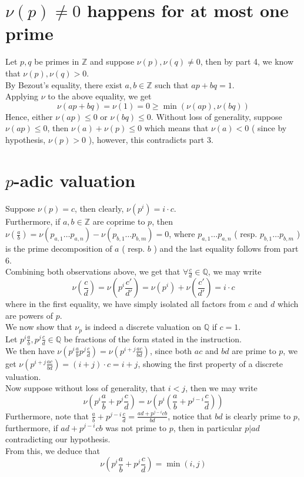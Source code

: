 \documentclass[11pt, a4paper]{article}
\begin{document}
\section*{$\nu( p) \neq 0$ happens for at most one prime}
Let $p,q$ be primes in $\mathbb{Z}$ and suppose $\nu( p) ,\nu( q) \neq 0$, then by part 4, we know that $\nu( p),\nu( q) >0 $.\\
By Bezout's equality, there exist $a,b \in \mathbb{Z}$ such that $ a p + bq =1$.\\
Applying $\nu$ to the above equality, we get
\[ 
\nu( ap + bq)  = \nu( 1) = 0 \geq \min ( \nu( ap) , \nu( bq) ) 
\]
Hence, either $ \nu( ap) \leq 0$ or $\nu( bq) \leq 0$. Without loss of generality, suppose $ \nu( ap) \leq 0$, then $\nu( a) +\nu( p) \leq 0$ which means that $\nu( a) <0$ ( since by hypothesis, $\nu( p) >0$ ), however, this contradicts part 3.
\section*{$p$-adic valuation}
Suppose $\nu( p) = c$, then clearly, $\nu( p^{i}) = i\cdot c$.\\
Furthermore, if $a,b\in \mathbb{Z}$ are coprime to $p$, then $ \nu( \frac{a}{b}) = \nu( p_{a,1} \ldots p_{a,n} 	) - \nu( p_{b,1} \ldots p_{b,m} )=0 $, where $p_{a,1}\ldots p_{a,n}  $ ( resp. $ p_{b,1} \ldots p_{b,m} $  ) is the prime decomposition of $a$ ( resp. $b$ ) and the last equality follows from part 6.\\
Combining both observations above, we get that $ \forall \frac{c}{d}\in \mathbb{Q}$, we may write
\[ 
\nu( \frac{c}{d}) = \nu( p^{i} \frac{c'}{d'}) =\nu(p^{i}) + \nu( \frac{c'}{d'}) = i\cdot c
\]
where in the first equality, we have simply isolated all factors from $c$ and $d$ which are powers of $p$.\\
We now show that $\nu_p$ is indeed a discrete valuation on $ \mathbb{Q}$ if $c=1$.\\
Let $ p^{i} \frac{a}{b}, p^{j} \frac{c}{d}\in \mathbb{Q}$ be fractions of the form stated in the instruction.\\
We then have $\nu\left( p^{i} \frac{a}{b} p^{j} \frac{c}{d}	\right) = \nu( p^{i+j} \frac{ac}{bd})  $, since both $ac$ and $bd$ are prime to $p$, we get $\nu\left( p^{i+j} \frac{ac}{bd}\right) = ( i+j )\cdot c = i+j$, showing the first property of a discrete valuation.\\
Now suppose without loss of generality, that $ i<j$, then we may write 
\[ 
\nu( p^{i}\frac{a}{b}+ p^{j}\frac{c}{d}) = \nu\left( p^{i}\left( \frac{a}{b}+ p^{j-i} \frac{c}{d}\right) \right) 
\]
Furthermore, note that $ \frac{a}{b}+ p^{j-i}\frac{c}{d}= \frac{ad+ p^{j-i}cb}{bd}$, notice that $bd$ is clearly prime to $p$, furthermore, if $ad + p^{j-i}cb$ was not prime to $p$, then in particular $ p | ad$ contradicting our hypothesis.\\
From this, we deduce that 
\[ 
\nu( p^{i} \frac{a}{b}+ p^{j} \frac{c}{d}) = \min ( i,j) 	
\]
\end{document}
